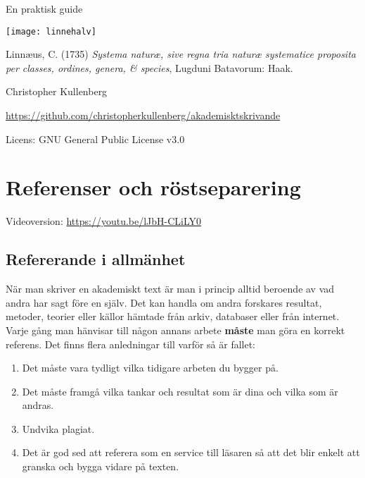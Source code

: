\documentclass[11pt,a5paper,footinclude=true,headinclude=true]{scrbook} %
\begin{document}
\thispagestyle{empty}
\begin{center}
\begin{LARGE}

\end{LARGE}

\bigskip
En praktisk guide


\texttt{[image: linnehalv]}

\begin{tiny}
\noindent Linnæus, C. (1735) \emph{Systema naturæ, sive regna tria naturæ systematice proposita per classes, ordines, genera, & species}, Lugduni Batavorum: Haak.
\end{tiny}
\end{center}

\bigskip
\bigskip
\bigskip

\begin{tiny}
\noindent Christopher Kullenberg

\noindent \href{https://github.com/christopherkullenberg/akademisktskrivande}{https://github.com/christopherkullenberg/akademisktskrivande}

\noindent Licens: GNU General Public License v3.0
\end{tiny}

	\tableofcontents
	\thispagestyle{empty}






    \chapter{Referenser och röstseparering}

Videoversion: \href{https://youtu.be/lJbH-CLiLY0}{https://youtu.be/lJbH-CLiLY0}

\section{Refererande i allmänhet}

När man skriver en akademiskt text är man i princip alltid beroende av vad andra har sagt före en själv. Det kan handla om andra forskares resultat, metoder, teorier eller källor hämtade från arkiv, databaser eller från internet. Varje gång man hänvisar till någon annans arbete \textbf{måste} man göra en korrekt referens. Det finns flera anledningar till varför så är fallet:

\begin{small}
\begin{enumerate}
\item Det måste vara tydligt vilka tidigare arbeten du bygger på.
\item Det måste framgå vilka tankar och resultat som är dina och vilka som  är andras. 
\item Undvika plagiat.
\item Det är god sed att referera som en service till läsaren så att det blir enkelt att granska och bygga vidare på texten. 
\end{enumerate}
\end{small}
\end{document}
